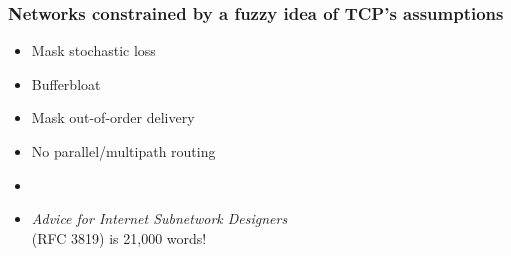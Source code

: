 \documentclass[svgnames]{beamer}
\begin{document}
\begin{frame}
\frametitle{Networks constrained by a fuzzy idea of TCP's assumptions}

\Large

\begin{itemize}
\item Mask stochastic loss
\item Bufferbloat
\item Mask out-of-order delivery
\item No parallel/multipath routing
\item[]
\item[] {\it Advice for Internet Subnetwork Designers}\\ (RFC 3819) is 21,000 words!
\end{itemize}

\end{frame}
\end{document}
